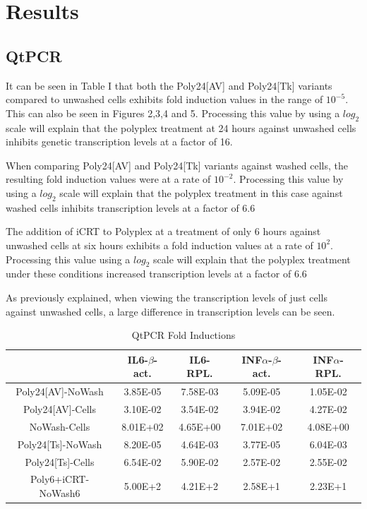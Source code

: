 \documentclass[journal, a4paper]{IEEEtran}
\begin{document}
\section{Results}

  \subsection{QtPCR}

  It can be seen in Table I that both the Poly24[AV] and Poly24[Tk] variants compared to unwashed cells
  exhibits fold induction values in the range of $10^{-5}$. This can also be seen in Figures 2,3,4 and 5.
  Processing this value by using a $log_2$ scale will explain that the polyplex treatment at 24 hours
  against unwashed cells inhibits genetic transcription levels at a factor of 16.

  When comparing Poly24[AV] and Poly24[Tk] variants against washed cells,
  the resulting fold induction values were at a rate of $10^{-2}$. Processing this value
  by using a $log_2$ scale will explain that the polyplex treatment
  in this case against washed cells inhibits transcription levels at a factor of 6.6

  The addition of iCRT to Polyplex at a treatment of only 6 hours against unwashed
  cells at six hours exhibits a fold induction values at a rate of $10^2$. Processing
  this value using a $log_2$ scale will explain that the polyplex treatment under these
  conditions increased transcription levels at a factor of 6.6

  As previously explained, when viewing the transcription levels of just cells
  against unwashed cells, a large difference in transcription levels can be seen.

    \begin{table}[!hbt]
      \begin{center}
      \caption{QtPCR Fold Inductions}
      \label{tab:simParameters}
      \begin{tabular}{|c|c|c|c|c|}
        \hline
        & IL6-$\beta$-act. & IL6-RPL. & INF$\alpha$-$\beta$-act. & INF$\alpha$-RPL. \\
        \hline
        Poly24[AV]-NoWash & 3.85E-05 & 7.58E-03 & 5.09E-05 & 1.05E-02 \\
        \hline
        Poly24[AV]-Cells & 3.10E-02 & 3.54E-02 & 3.94E-02 & 4.27E-02 \\
        \hline
        NoWash-Cells & 8.01E+02 & 4.65E+00 & 7.01E+02 & 4.08E+00 \\
        \hline
        Poly24[Ts]-NoWash & 8.20E-05 & 4.64E-03 & 3.77E-05 & 6.04E-03\\
        \hline
        Poly24[Ts]-Cells & 6.54E-02 & 5.90E-02 & 2.57E-02 & 2.55E-02\\
        \hline
        Poly6+iCRT-NoWash6 & 5.00E+2 & 4.21E+2 & 2.58E+1 & 2.23E+1 \\
        \hline
      \end{tabular}
      \end{center}
    \end{table}
\end{document}

